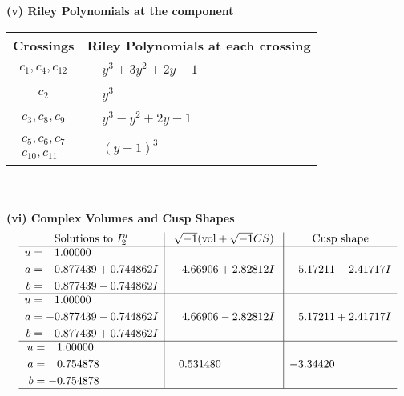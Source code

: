 \documentclass[1p]{elsarticle_modified}
\theoremstyle{definition}
\newcommand{\I}{\sqrt{-1}}
\begin{document}
\flushleft \textbf{(v) Riley Polynomials at the component}\newline \\
\begin{tabular}{m{50pt}|m{274pt}}
Crossings & \hspace{64pt}Riley Polynomials at each crossing \\
\hline $$\begin{aligned}c_{1},c_{4},c_{12}\end{aligned}$$&$\begin{aligned}
&y^3+3 y^2+2 y-1
\end{aligned}$\\
\hline $$\begin{aligned}c_{2}\end{aligned}$$&$\begin{aligned}
&y^3
\end{aligned}$\\
\hline $$\begin{aligned}c_{3},c_{8},c_{9}\end{aligned}$$&$\begin{aligned}
&y^3- y^2+2 y-1
\end{aligned}$\\
\hline $$\begin{aligned}c_{5},c_{6},c_{7}\\c_{10},c_{11}\end{aligned}$$&$\begin{aligned}
&(y-1)^3
\end{aligned}$\\
\hline
\end{tabular}\\~\\
\newpage\flushleft \textbf{(vi) Complex Volumes and Cusp Shapes}
$$\begin{array}{c|c|c}  
\text{Solutions to }I^u_{2}& \I (\text{vol} + \sqrt{-1}CS) & \text{Cusp shape}\\
 \hline 
\begin{aligned}
u &= \phantom{-}1.00000\phantom{ +0.000000I} \\
a &= -0.877439 + 0.744862 I \\
b &= \phantom{-}0.877439 - 0.744862 I\end{aligned}
 & \phantom{-}4.66906 + 2.82812 I & \phantom{-}5.17211 - 2.41717 I \\ \hline\begin{aligned}
u &= \phantom{-}1.00000\phantom{ +0.000000I} \\
a &= -0.877439 - 0.744862 I \\
b &= \phantom{-}0.877439 + 0.744862 I\end{aligned}
 & \phantom{-}4.66906 - 2.82812 I & \phantom{-}5.17211 + 2.41717 I \\ \hline\begin{aligned}
u &= \phantom{-}1.00000\phantom{ +0.000000I} \\
a &= \phantom{-}0.754878\phantom{ +0.000000I} \\
b &= -0.754878\phantom{ +0.000000I}\end{aligned}
 & \phantom{-}0.531480\phantom{ +0.000000I} & -3.34420\phantom{ +0.000000I}\\
 \hline 
 \end{array}$$\newpage
\end{document}
